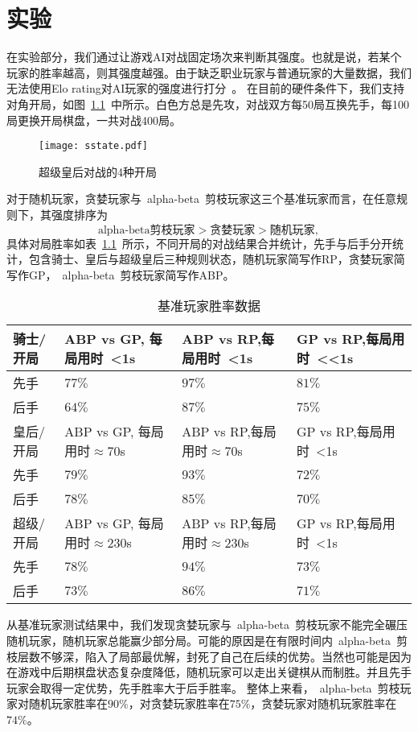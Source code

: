 \chapter{实验}
\label{chap:experiment}
在实验部分，我们通过让游戏AI对战固定场次来判断其强度。也就是说，若某个玩家的胜率越高，则其强度越强。由于缺乏职业玩家与普通玩家的大量数据，我们无法使用Elo rating对AI玩家的强度进行打分~\cite{glickman1999rating}。
在目前的硬件条件下，我们支持对角开局，如图~\ref{fig:sstate}~中所示。白色方总是先攻，对战双方每50局互换先手，每100局更换开局棋盘，一共对战400局。
\begin{figure}[H]
    \centering
    \texttt{[image: sstate.pdf]}
    \caption[sstate]{%
        超级皇后对战的4种开局%
      }
    \label{fig:sstate}
\end{figure}
对于随机玩家，贪婪玩家与~alpha-beta~剪枝玩家这三个基准玩家而言，在任意规则下，其强度排序为
\begin{equation*}
    \text{alpha-beta剪枝玩家} > \text{贪婪玩家} > \text{随机玩家} ,
\end{equation*}
具体对局胜率如表~\ref{table:baseresult}~所示，不同开局的对战结果合并统计，先手与后手分开统计，包含骑士、皇后与超级皇后三种规则状态，随机玩家简写作RP，贪婪玩家简写作GP，~alpha-beta~剪枝玩家简写作ABP。
\begin{table}[htb]
    \centering
    \caption[baseresult]{基准玩家胜率数据}
    \begin{tabular}{p{2cm}<{\centering} p{4cm}<{\centering} p{4cm}<{\centering} p{4cm}<{\centering}}
    \hline
    骑士/开局 & ABP vs GP, 每局用时~<1s & ABP vs RP,每局用时~<1s & GP vs RP,每局用时~<<1s \\ \hline
    先手 & $77\%$ & $97\%$ & $81\%$\\ 
    后手 & $64\%$ & $87\%$ & $75\%$\\ \hline
    皇后/开局 & ABP vs GP, 每局用时$\approx$70s & ABP vs RP,每局用时$\approx$70s & GP vs RP,每局用时~<1s \\ \hline
    先手 & $79\%$ & $93\%$ & $72\%$\\ 
    后手 & $78\%$ & $85\%$ & $70\%$\\ \hline
    超级/开局 & ABP vs GP, 每局用时$\approx$230s & ABP vs RP,每局用时$\approx$230s & GP vs RP,每局用时~<1s \\ \hline
    先手 & $78\%$ & $94\%$ & $73\%$\\ 
    后手 & $73\%$ & $86\%$ & $71\%$\\ \hline
    \end{tabular}
    \label{table:baseresult}
  \end{table}
从基准玩家测试结果中，我们发现贪婪玩家与~alpha-beta~剪枝玩家不能完全碾压随机玩家，随机玩家总能赢少部分局。可能的原因是在有限时间内~alpha-beta~剪枝层数不够深，陷入了局部最优解，封死了自己在后续的优势。当然也可能是因为在游戏中后期棋盘状态复杂度降低，随机玩家可以走出关键棋从而制胜。并且先手玩家会取得一定优势，先手胜率大于后手胜率。
整体上来看，~alpha-beta~剪枝玩家对随机玩家胜率在$90\%$，对贪婪玩家胜率在$75\%$，贪婪玩家对随机玩家胜率在$74\%$。
